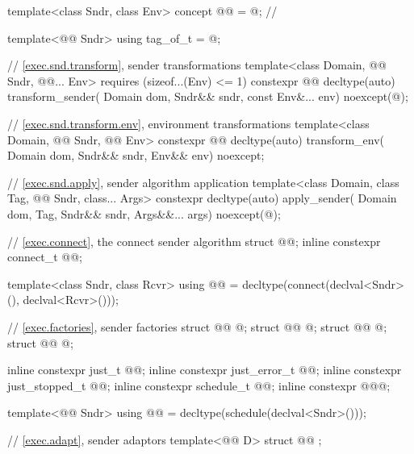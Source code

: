\begin{codeblock}
{  template<class Sndr, class Env>
    concept @@ = @\seebelow@; // \expos

  template<@@ Sndr>
    using tag_of_t = @\seebelow@;

  // \ref{exec.snd.transform}, sender transformations
  template<class Domain, @@ Sndr, @@... Env>
      requires (sizeof...(Env) <= 1)
    constexpr @@ decltype(auto) transform_sender(
      Domain dom, Sndr&& sndr, const Env&... env) noexcept(@\seebelow@);

  // \ref{exec.snd.transform.env}, environment transformations
  template<class Domain, @@ Sndr, @@ Env>
    constexpr @@ decltype(auto) transform_env(
      Domain dom, Sndr&& sndr, Env&& env) noexcept;

  // \ref{exec.snd.apply}, sender algorithm application
  template<class Domain, class Tag, @@ Sndr, class... Args>
    constexpr decltype(auto) apply_sender(
      Domain dom, Tag, Sndr&& sndr, Args&&... args) noexcept(@\seebelow@);

  // \ref{exec.connect}, the connect sender algorithm
  struct @@;
  inline constexpr connect_t @@{};

  template<class Sndr, class Rcvr>
    using @@ =
      decltype(connect(declval<Sndr>(), declval<Rcvr>()));

  // \ref{exec.factories}, sender factories
  struct @@ { @\unspec@ };
  struct @@ { @\unspec@ };
  struct @@ { @\unspec@ };
  struct @@ { @\unspec@ };

  inline constexpr just_t @@{};
  inline constexpr just_error_t @@{};
  inline constexpr just_stopped_t @@{};
  inline constexpr schedule_t @@{};
  inline constexpr @\unspec@ @@{};

  template<@@ Sndr>
    using @@ = decltype(schedule(declval<Sndr>()));

  // \ref{exec.adapt}, sender adaptors
  template<@@ D>
    struct @@ { };

}
\end{codeblock}
